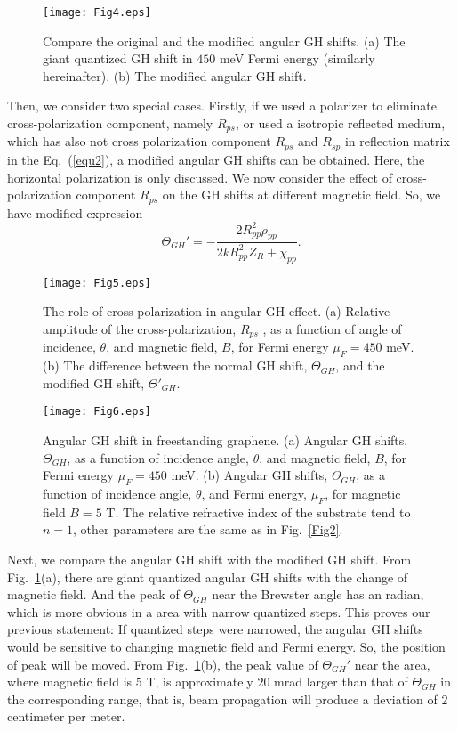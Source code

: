 \documentclass[twocolumn,showpacs,preprintnumbers,amsmath,amssymb]{revtex4}
\begin{document}
\begin{figure}
\centerline{\texttt{[image: Fig4.eps]}}
\caption{\label{Fig4} Compare the original and the modified angular GH shifts. (a) The giant quantized GH shift
in $450$ meV Fermi energy (similarly hereinafter).
(b) The modified angular GH shift.}
\end{figure}

Then, we consider two special cases. Firstly, if we used a polarizer
to eliminate cross-polarization component, namely $R_{ps}$,
or used a isotropic reflected medium, which has also not cross
polarization component $R_{ps}$ and $R_{sp}$ in reflection matrix
in the Eq.~(\ref{equ2}),
a modified angular GH shifts can be obtained. Here,
the horizontal polarization is only discussed.
We now consider the effect of cross-polarization component $R_{ps}$
on the GH shifts at different magnetic field.
So, we have modified expression
\begin{equation}\label{equ13}
  \Theta_{GH}'=-\frac{2R_{pp}^2\rho_{pp}}{2kR_{pp}^{2}Z_{R}+\chi_{pp}}.
\end{equation}

\begin{figure}
\centerline{\texttt{[image: Fig5.eps]}}
\caption{\label{Fig5} The role of cross-polarization in angular GH effect. (a) Relative amplitude of the cross-polarization, $R_{ps}$ ,
as a function of angle of incidence, $\theta$, and magnetic field, $B$, for Fermi energy $\mu_{F}=450$ meV.
(b) The difference between the normal GH shift, $\Theta_{GH}$, and the modified GH shift, $\Theta'_{GH}$.}
\end{figure}

\begin{figure}
\centerline{\texttt{[image: Fig6.eps]}}
\caption{\label{Fig6} Angular GH shift in freestanding graphene.
(a) Angular GH shifts, $\Theta_{GH}$, as a function of incidence angle, $\theta$,
and magnetic field, $B$, for Fermi energy $\mu_{F}=450$ meV.
(b) Angular GH shifts, $\Theta_{GH}$, as a function of incidence angle, $\theta$,
and Fermi energy, $\mu_{F}$, for magnetic field $B=5$ T.
The relative refractive index of the substrate tend to $n=1$,
other parameters are the same as in Fig.~\ref{Fig2}.}
\end{figure}

Next, we compare the angular GH shift with the modified GH shift.
From Fig.~\ref{Fig4}(a), there are giant quantized angular GH shifts with the change of magnetic field.
And the peak of $\Theta_{GH}$
near the Brewster angle has an radian, which is more obvious in a area with narrow quantized steps.
This proves our previous statement: If quantized steps were narrowed,
the angular GH shifts would be sensitive to changing magnetic field and Fermi energy.
So, the position of peak will be moved.
From Fig.~\ref{Fig4}(b), the peak value of $\Theta_{GH}'$ near the area,
where magnetic field is $5$ T,
is approximately $20$ mrad larger than that of $\Theta_{GH}$ in the corresponding range,
that is, beam propagation will produce a deviation of $2$ centimeter per meter.
\end{document}
